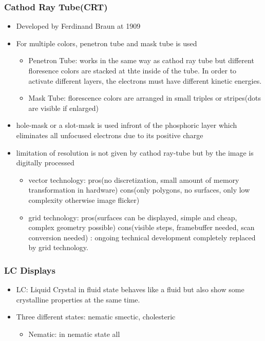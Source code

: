 \documentclass{standalone}
\begin{document}
\subsubsection*{Cathod Ray Tube(CRT)}
\begin{itemize}
\item Developed by Ferdinand Braun at 1909
\item For multiple colors, penetron tube and mask tube is used
\begin{itemize}
\item Penetron Tube: works in the same way as cathod ray tube but different floresence colors are stacked at thte inside of the tube. In order to activate different layers, the electrons must have different kinetic energies.
\item Mask Tube: florescence colors are arranged in small triples or stripes(dots are visible if enlarged)
\end{itemize}
\item hole-mask or a slot-mask is used infront of the phosphoric layer which eliminates all unfocused electrons due to its positive charge
\item limitation of resolution is not given by cathod ray-tube but by the image is digitally processed
\begin{itemize}
\item vector technology: pros(no discretization, small amount of memory transformation in hardware) cons(only polygons, no surfaces, only low complexity otherwise image flicker)
\item grid technology: pros(surfaces can be displayed, simple and cheap, complex geometry possible) cons(visible steps, framebuffer needed, scan conversion needed) : ongoing technical development completely replaced by grid technology.
\end{itemize}
\end{itemize}
\subsubsection*{LC Displays}
\begin{itemize}
\item LC: Liquid Crystal in fluid state behaves like a fluid but also show some crystalline properties at the same time.
\item Three different states: nematic smectic, cholesteric
\begin{itemize}
\item Nematic: in nematic state all 
\end{itemize}
\end{itemize}
\end{document}

